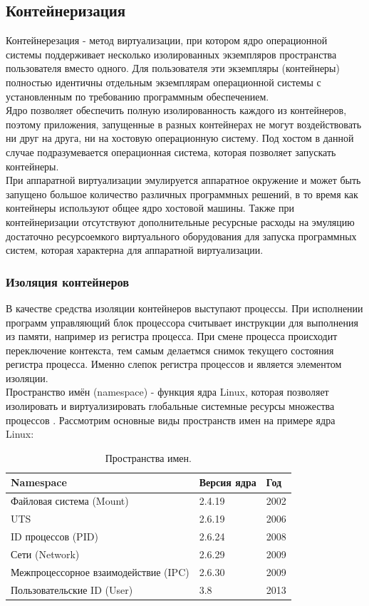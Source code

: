 \documentclass[a4paper,14pt]{extreport} %
\begin{document}
\subsection{Контейнеризация}
Контейнерезация - метод виртуализации, при котором ядро операционной системы поддерживает несколько изолированных экземпляров пространства пользователя вместо одного. Для пользователя эти экземпляры (контейнеры) полностью идентичны отдельным экземплярам операционной системы с установленным по требованию программным обеспечением. \\
Ядро позволяет обеспечить полную изолированность каждого из контейнеров, поэтому приложения, запущенные в разных контейнерах не могут воздействовать ни друг на друга, ни на хостовую операционную систему. Под хостом в данной случае подразумевается операционная система, которая позволяет запускать контейнеры. \\
При аппаратной виртуализации эмулируется аппаратное окружение и может быть запущено большое количество различных программных решений, в то время как контейнеры используют общее ядро хостовой машины. Также при контейнеризации отсутствуют дополнительные ресурсные расходы на эмуляцию достаточно ресурсоемкого виртуального оборудования для запуска программных систем, которая характерна для аппаратной виртуализации.

\subsubsection{Изоляция контейнеров}
В качестве средства изоляции контейнеров выступают процессы.
При исполнении программ управляющий блок процессора считывает инструкции для выполнения из памяти, например из регистра процесса. При смене процесса происходит переключение контекста, тем самым делаетмся снимок текущего состояния регистра процесса. Именно слепок регистра процессов и является элементом изоляции. \\
Пространство имён (namespace) - функция ядра Linux, которая позволяет изолировать и виртуализировать глобальные системные ресурсы множества процессов \cite{CONTAINER_ISOLATION}.  Рассмотрим основные виды пространств имен на примере ядра Linux:
\begin{table}[H]
\caption {Пространства имен.} \label{tab:}
\begin{center}
\begin{tabular}{| p{9cm}  | p{3.5cm}  | p{1.5cm} |}
\hline
\textbf{Namespace} & \textbf{Версия ядра} & \textbf{Год} \\
\hline
Файловая система (Mount) & 2.4.19 & 2002 \\
\hline
UTS & 2.6.19 & 2006 \\
\hline
ID процессов (PID) & 2.6.24 & 2008 \\
\hline
Сети (Network) & 2.6.29 & 2009 \\
\hline
Межпроцессорное взаимодействие (IPC) & 2.6.30 & 2009 \\
\hline
Пользовательские ID (User) & 3.8& 2013 \\
\hline
\end{tabular}
\end{center}
\end{table}
\end{document}
